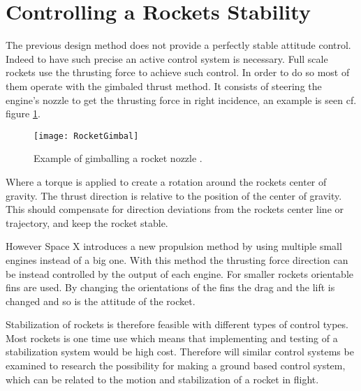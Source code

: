 \section{Controlling a Rockets Stability}
The previous design method does not provide a perfectly stable attitude control. Indeed to have such precise an active control system is necessary. Full scale rockets use the thrusting force to achieve such control. In order to do so most of them operate with the gimbaled thrust method. It consists of steering the engine's nozzle to get the thrusting force in right incidence, an example is seen cf. figure \ref{fig:RocketGimbal}. 
\begin{figure} [htbp]
	\centering
	\texttt{[image: RocketGimbal]}
	\caption{Example of gimballing a rocket nozzle \cite{web:rocketnasa}.}
	\label{fig:RocketGimbal}
\end{figure}

Where a torque is applied to create a rotation around the rockets center of gravity. The thrust direction is relative to the position of the center of gravity.  This should compensate for direction deviations from the rockets center line or trajectory, and keep the rocket stable.    	

However Space X introduces a new propulsion method by using multiple small engines instead of a big one. With this method the thrusting force direction can be instead controlled by the output of each engine. For smaller rockets orientable fins are used. By changing the orientations of the fins the drag and the lift is changed and so is the attitude of the rocket.


Stabilization of rockets is therefore feasible with different types of control types. Most rockets is one time use which means that implementing and testing of a stabilization system would be high cost. Therefore will similar control systems be examined to research the possibility for making a ground based control system, which can be related to the motion and stabilization of a rocket in flight. 